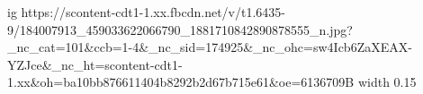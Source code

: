  
 
 
 
 

\par
\ifcmt
  ig https://scontent-cdt1-1.xx.fbcdn.net/v/t1.6435-9/184007913_459033622066790_1881710842890878555_n.jpg?_nc_cat=101&ccb=1-4&_nc_sid=174925&_nc_ohc=sw4Icb6ZaXEAX-YZJce&_nc_ht=scontent-cdt1-1.xx&oh=ba10bb876611404b8292b2d67b715e61&oe=6136709B
  width 0.15
\fi
